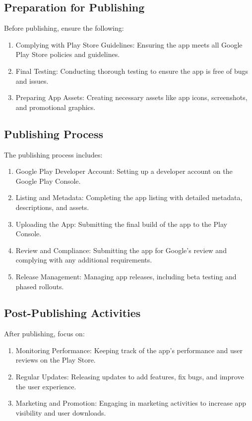 \documentclass{book}
\begin{document}
\subsection{Preparation for Publishing}
Before publishing, ensure the following:
\begin{enumerate}
    \item Complying with Play Store Guidelines: Ensuring the app meets all Google Play Store policies and guidelines.
    \item Final Testing: Conducting thorough testing to ensure the app is free of bugs and issues.
    \item Preparing App Assets: Creating necessary assets like app icons, screenshots, and promotional graphics.
\end{enumerate}

\subsection{Publishing Process}
The publishing process includes:
\begin{enumerate}
    \item Google Play Developer Account: Setting up a developer account on the Google Play Console.
    \item Listing and Metadata: Completing the app listing with detailed metadata, descriptions, and assets.
    \item Uploading the App: Submitting the final build of the app to the Play Console.
    \item Review and Compliance: Submitting the app for Google's review and complying with any additional requirements.
    \item Release Management: Managing app releases, including beta testing and phased rollouts.
\end{enumerate}

\subsection{Post-Publishing Activities}
After publishing, focus on:
\begin{enumerate}
    \item Monitoring Performance: Keeping track of the app’s performance and user reviews on the Play Store.
    \item Regular Updates: Releasing updates to add features, fix bugs, and improve the user experience.
    \item Marketing and Promotion: Engaging in marketing activities to increase app visibility and user downloads.
\end{enumerate}
\end{document}
